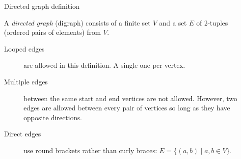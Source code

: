\documentclass{beamer}
\begin{document}
  
  
  \begin{frame}{Directed graph definition}
    \vspace{-4mm}
    \begin{definition}
    A \emph{directed graph} (digraph) consists of a finite set $V$ and a set $E$ of 2-tuples (ordered pairs of elements) from $V$.
    \end{definition}
    \vspace{0.2cm}
    \begin{description}
      \item[Looped edges] are allowed in this definition. A single one per vertex.
      \item[Multiple edges] between the same start and end vertices are not allowed. However, two edges are allowed between every pair of vertices so long as they have opposite directions.
      \item[Direct edges] use round brackets rather than curly braces: $E = \{ (a,b) \mid a,b \in V\}$.
    \end{description}
  \end{frame}
  
\end{document}
